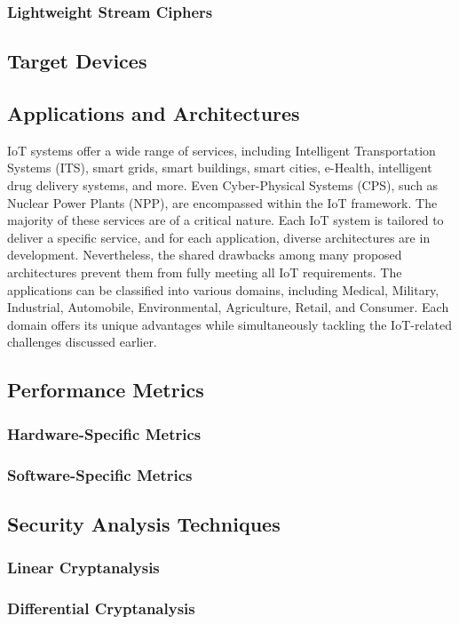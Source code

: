 \documentclass[conference,compsoc]{IEEEtran}
\begin{document}
\subsubsection{Lightweight Stream Ciphers} 
\subsection{Target Devices}
\subsection{Applications and Architectures}
IoT systems offer a wide range of services, including Intelligent Transportation Systems (ITS), smart grids, smart buildings, smart cities, e-Health, intelligent drug delivery systems, and more. Even Cyber-Physical Systems (CPS), such as Nuclear Power Plants (NPP), are encompassed within the IoT framework. The majority of these services are of a critical nature. Each IoT system is tailored to deliver a specific service, and for each application, diverse architectures are in development. 
Nevertheless, the shared drawbacks among many proposed architectures prevent them from fully meeting all IoT requirements. The applications can be classified into various domains, including Medical, Military, Industrial, Automobile, Environmental, Agriculture, Retail, and Consumer. Each domain offers its unique advantages while simultaneously tackling the IoT-related challenges discussed earlier.
\subsection{Performance Metrics} 
\subsubsection{Hardware-Specific Metrics} 
\subsubsection{Software-Specific Metrics} 
\subsection{Security Analysis Techniques}
\subsubsection{Linear Cryptanalysis} 
\subsubsection{Differential Cryptanalysis} 
\end{document}
